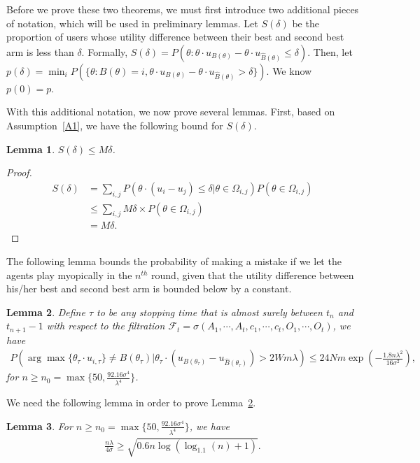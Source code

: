 \documentclass{article}
\newtheorem{lemma}{Lemma}
\begin{document}
Before we prove these two theorems, we must first introduce two additional pieces of notation, which will be used in preliminary lemmas.  Let $S(\delta)$ be the proportion of users whose utility difference between their best and second best arm is less than $\delta$. Formally, $S(\delta)=P(\theta: \theta \cdot u_{B(\theta)}-\theta\cdot u_{\hat{B}(\theta)}\leq \delta)$. Then, let $p(\delta)=\min_{i}P(\{\theta:B(\theta)=i,\theta\cdot u_{B(\theta)}-\theta\cdot u_{\hat{B}(\theta)}>\delta\})$. We know $p(0)=p$. 

With this additional notation, we now prove several lemmas.
First, based on Assumption~\ref{A1}, we have the following bound for $S(\delta)$.

\begin{lemma}
$S(\delta)\leq M\delta$.
\label{lemma:sdelta}
\end{lemma}

\begin{proof}
\begin{align*}
S(\delta)
&=\sum_{i,j}P(\theta\cdot(u_{i}-u_{j})\le \delta|\theta\in \Omega_{i,j})P(\theta\in \Omega_{i,j}) \\
&\leq \sum_{i,j}M\delta \times P(\theta\in \Omega_{i,j}) \\
&=M\delta.
\end{align*}
\end{proof}

The following lemma bounds the probability of making a mistake if we let the agents play myopically in the $n^{th}$ round, given that the utility difference between his/her best and second best arm is bounded below by a constant. 

\begin{lemma}
Define $\tau$ to be any stopping time that is almost surely between $t_n$ and $t_{n+1}-1$ with respect to the filtration $\mathcal{F}_{t}=\sigma(A_1,\cdots,A_t,c_1,\cdots,c_t,O_1,\cdots,O_t)$, we have 
\begin{align}
P(\arg\max\{\theta_{\tau}\cdot u_{i,\tau}\}\neq B(\theta_{\tau})|\theta_{\tau}\cdot(u_{B(\theta_{\tau})}-u_{\hat{B}(\theta_{\tau})})> 2Wm\lambda)\leq 24Nm\exp\left(-\frac{1.8n\lambda^2}{16\sigma^2}\right), \nonumber
\end{align}
for $n\geq n_{0}=\max\{50, \frac{92.16\sigma^4}{\lambda^4}\}$.
\label{round:prob}
\end{lemma}


We need the following lemma in order to prove Lemma~\ref{round:prob}.

\begin{lemma}
For $n\geq n_{0}=\max\{50, \frac{92.16\sigma^4}{\lambda^4}\}$, we have
\begin{align}
\frac{n\lambda}{4\sigma}\geq \sqrt{0.6n\log(\log_{1.1}(n)+1)}. \nonumber
\end{align}
\label{n0-inequality}
\end{lemma}
\end{document}
